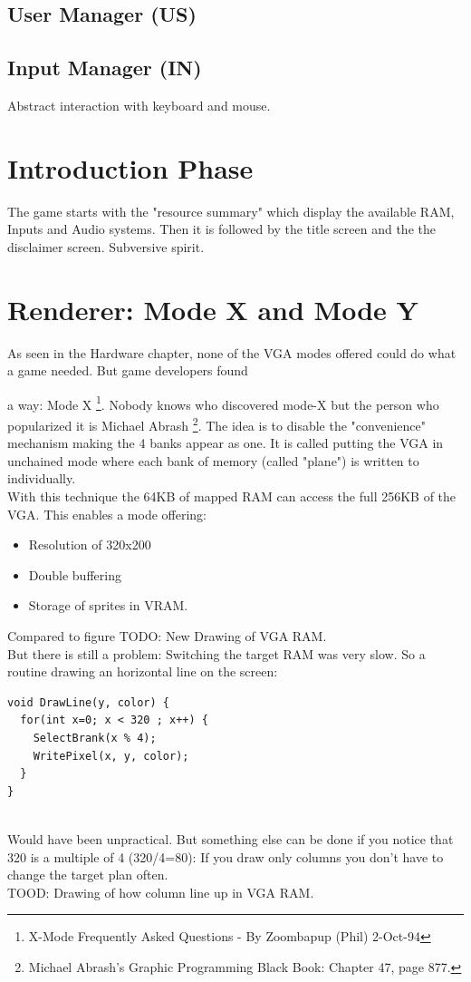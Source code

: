 \documentclass[book.tex]{subfiles}
\begin{document}
\subsection{User Manager (US)}


\subsection{Input Manager (IN)}
Abstract interaction with keyboard and mouse.

\section{Introduction Phase}
The game starts with the "resource summary" which display the available RAM, Inputs and Audio systems. Then it is followed by the title screen and the the disclaimer screen. Subversive spirit.

\section{Renderer: Mode X and Mode Y}
As seen in the Hardware chapter, none of the VGA modes offered could do what a game needed. But game developers found

a way: Mode X \footnote{X-Mode Frequently Asked Questions - By Zoombapup (Phil)  2-Oct-94}. Nobody knows who discovered mode-X but the person who popularized it is Michael Abrash \footnote{Michael Abrash's Graphic Programming Black Book: Chapter 47, page 877.}. The idea is to disable the "convenience" mechanism making the 4 banks appear as one. It is called putting the VGA in unchained mode where each bank of memory (called "plane") is written to individually.\\
With this technique the 64KB of mapped RAM can access the full 256KB of the VGA. This enables a mode offering:
\begin{itemize}
	\item Resolution of 320x200
	\item Double buffering
	\item Storage of sprites in VRAM.
\end{itemize}

Compared to figure 
TODO: New Drawing of VGA RAM.\\
But there is still a problem: Switching the target RAM was very slow. So a routine drawing an horizontal line on the screen:

\begin{verbatim}
void DrawLine(y, color) {
  for(int x=0; x < 320 ; x++) {
    SelectBrank(x % 4);
    WritePixel(x, y, color);   
  }
}
\end{verbatim}\\
Would have been unpractical. But something else can be done if you notice that 320 is a multiple of 4 (320/4=80): If you draw only columns you don't have to change the target plan often.\\
TOOD: Drawing of how column line up in VGA RAM.\\
\end{document}

